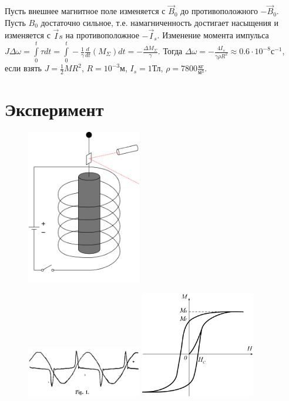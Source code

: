 \documentclass[a4paper]{article}
\begin{document}
Пусть внешнее магнитное поле изменяется с $\vec{B}_0$ до противоположного $-\vec{B}_0$. Пусть $B_0$ достаточно сильное, т.е. намагниченность достигает насыщения и изменяется с $\vec{I}s$ на противоположное $-\vec{I}_s$. Изменение момента импульса $J\Delta \omega=\int\limits_0^t\tau dt=\int\limits_0^t -\frac{1}{\gamma}\frac{d}{dt}(M_\Sigma) dt=-\frac{\Delta M_\Sigma}{\gamma}$. Тогда $\Delta\omega=-\frac{4I_s}{\gamma\rho R^2}\approx 0.6\cdot 10^{-8}\mbox{с}^{-1}$, если взять $J=\frac{1}{2}MR^2$, $R=10^{-3}\mbox{м}$, $I_s=1\mbox{Тл}$, $\rho=7800\frac{\mbox{кг}}{\mbox{м}^3}$.

\section*{Эксперимент}
\begin{figure}
	\begin{center}
		\includegraphics[width=5cm]{lab.png}
	\end{center}
\end{figure}
\begin{figure}
	\begin{center}
		\includegraphics[width=5cm]{fig1.png}
		\includegraphics[width=5cm]{hyst.jpg}
	\end{center}
\end{figure}
\end{document}

